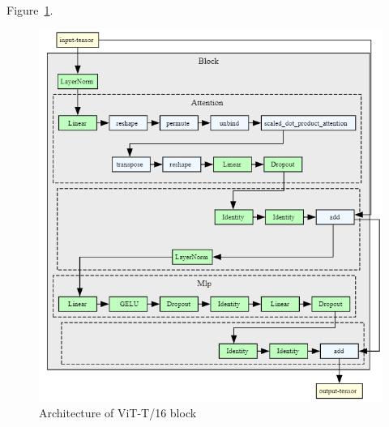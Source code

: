 Figure~\ref{fig:vit_t16_architecture_block}.

\begin{figure}[H]
    \begin{center}
    \includegraphics[width=15cm]{../images/vit_t16_architecture_block.png}
    \caption{Architecture of ViT-T/16 block}\label{fig:vit_t16_architecture_block}
    \end{center}
\end{figure}





